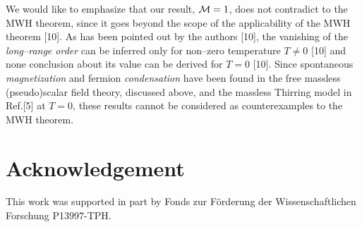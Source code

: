 \documentclass[a4paper,12pt] {article}
\begin{document}
We would like to emphasize that our result, ${\cal M} = 1$, does not
contradict to the MWH theorem, since it goes beyond the scope of the
applicability of the MWH theorem [10]. As has been pointed out by the
authors [10], the vanishing of the {\it long--range order} can be
inferred only for non--zero temperature $T\neq 0$ [10] and none
conclusion about its value can be derived for $T=0$ [10]. Since
spontaneous {\it magnetization} and fermion {\it condensation} have
been found in the free massless (pseudo)scalar field theory, discussed
above, and the massless Thirring model in Ref.[5] at $T = 0$, these
results cannot be considered as counterexamples to the MWH theorem.


\section*{Acknowledgement}

\hspace{0.2in} This work was supported in part by Fonds zur
F\"orderung der Wissenschaftlichen Forschung P13997-TPH.



\newpage
\end{document}
